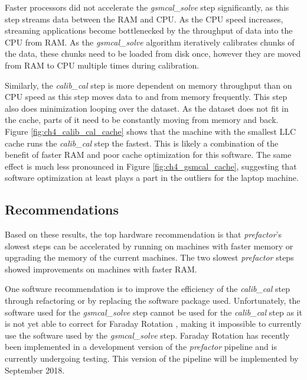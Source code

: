 Faster processors did not accelerate the \textit{gsmcal\_solve} step significantly, as this step streams data between the RAM and CPU. As the CPU speed increases, streaming applications become bottlenecked by the throughput of data into the CPU from RAM. As the \textit{gsmcal\_solve} algorithm iteratively calibrates chunks of the data, these chunks need to be loaded from disk once, however they are moved from RAM to CPU multiple times during calibration. 

Similarly, the \textit{calib\_cal} step is more dependent on memory throughput than on CPU speed as this step moves data to and from memory frequently. This step also does minimization looping over the dataset. As the dataset does not fit in the cache, parts of it need to be constantly moving from memory and back. Figure \ref{fig:ch4_calib_cal_cache} shows that the machine with the smallest LLC cache runs the \textit{calib\_cal} step the fastest. This is likely a combination of the benefit of faster RAM and poor cache optimization for this software. The same effect is much less pronounced in Figure \ref{fig:ch4_gsmcal_cache}, suggesting that software optimization at least plays a part in the outliers for the laptop machine. 

\subsection{Recommendations}
Based on these results, the top hardware recommendation is that \textit{prefactor}'s slowest steps can be accelerated by running on machines with faster memory or upgrading the memory of the current machines. The two slowest \textit{prefactor} steps showed improvements on machines with faster RAM.  

One software recommendation is to improve the efficiency of the \textit{calib\_cal} step through refactoring or by replacing the software package used. Unfortunately, the software used for the \textit{gsmcal\_solve} step cannot be used for the \textit{calib\_cal} step as it is not yet able to  correct for Faraday Rotation \citep{stefcal}, making it impossible to currently use the software used by the \textit{gsmcal\_solve} step. Faraday Rotation has recently been implemented in a development version of the \textit{prefactor} pipeline and is currently undergoing testing. This version of the pipeline will be implemented by September 2018.

